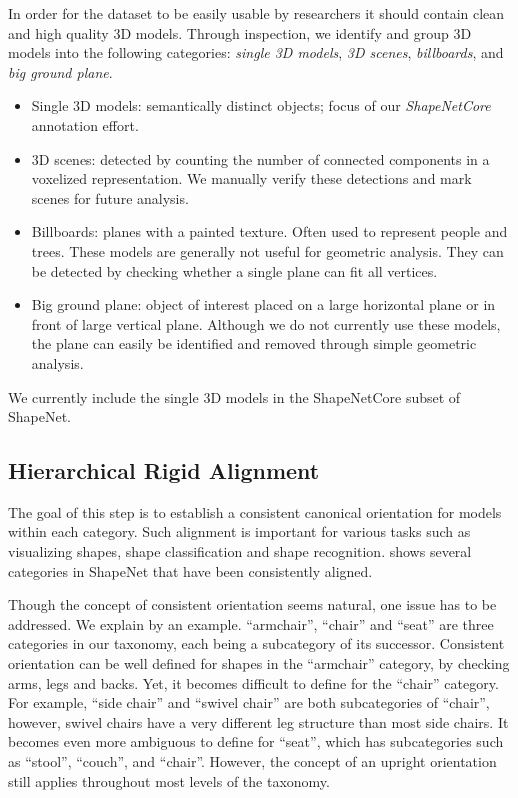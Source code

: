 In order for the dataset to be easily usable by researchers it should contain clean and high quality 3D models.  Through inspection, we identify and group 3D models into the following categories: \emph{single 3D models}, \emph{3D scenes}, \emph{billboards}, and \emph{big ground plane}.

\begin{itemize}\denselist
  \item Single 3D models: semantically distinct objects; focus of our \emph{ShapeNetCore} annotation effort.
  \item 3D scenes: detected by counting the number of connected components in a voxelized representation. We manually verify these detections and mark scenes for future analysis.
  \item Billboards: planes with a painted texture. Often used to represent people and trees. These models are generally not useful for geometric analysis. They can be detected by checking whether a single plane can fit all vertices.
  \item Big ground plane: object of interest placed on a large horizontal plane or in front of large vertical plane. Although we do not currently use these models, the plane can easily be identified and removed through simple geometric analysis.
\end{itemize}

We currently include the single 3D models in the ShapeNetCore subset of ShapeNet.

\subsection{Hierarchical Rigid Alignment}
\label{sec:alignment}
The goal of this step is to establish a consistent canonical orientation for models within each category. Such alignment is important for various tasks such as visualizing shapes, shape classification and shape recognition.  shows several categories in ShapeNet that have been consistently aligned.

Though the concept of consistent orientation seems natural, one issue has to be addressed. We explain by an example. ``armchair'', ``chair'' and ``seat'' are three categories in our taxonomy, each being a subcategory of its successor. Consistent orientation can be well defined for shapes in the ``armchair'' category, by checking arms, legs and backs. Yet, it becomes difficult to define for the ``chair'' category. For example, ``side chair'' and ``swivel chair'' are both subcategories of ``chair'', however, swivel chairs have a very different leg structure than most side chairs. It becomes even more ambiguous to define for ``seat'', which has subcategories such as ``stool'', ``couch'', and ``chair''. However, the concept of an upright orientation still applies throughout most levels of the taxonomy.

